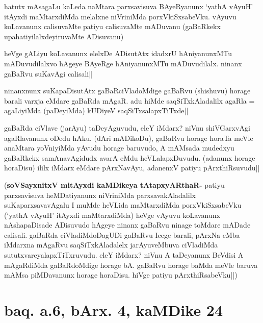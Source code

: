 \begin{artha}
hatutx mAsagaLu kaLeda naMtara parxsavisuva BAyeRyanunx `yathA vAyuH' 
itAyxdi maMtarxdiMda melalxne niVriniMda porxVkiSxsabeVku. vAyuvu 
koLavanunx calisuvaMte patiyu calisuvaMte mADuvanu (gaBaRkekx 
upahatiyilalxdeyiruvaMte ADisuvanu)
\end{artha}


\begin{artha}
heVge gALiyu koLavanunx elelxDe ADisutAtx idadxrU hAniyanunxMTu 
mADuvudilalxvo hAgeye BAyeRge hAniyanunxMTu mADuvudilalx. ninanx 
gaBaRvu suKavAgi calisali||
\end{artha}

\begin{artha}
ninanxnunx suKapaDisutAtx gaBaRciVladoMdige gaBaRvu (shishuvu) horage 
barali varxja eMdare gaBaRda mAgaR. adu hiMde saqSiTxkAladalilx agaRla 
= agaLiyiMda (paDeyiMda) kUDiyeV saqSiTxsalapxTiTxde||
\end{artha}


\begin{artha}
gaBaRda ciVlave (jarAyu) taDeyAguvudu, eleY iMdarx? niVnu shiVGarxvAgi 
agaRlavanunx oDedu hAku. (dAri mADikoDu), gaBaRvu horage horaTa meVle 
anaMtara yoVniyiMda yAvudu horage baruvudo, A mAMsada mudedxyu 
gaBaRkekx samAnavAgidudx avarA eMdu heVLalapxDuvudu. (adanunx horage 
horaDisu) ililx iMdarx eMdare pArxNavAyu, adanenxV patiyu 
pArxthiRsuvudu||
\end{artha}

(\textbf{soVSayxnitxV mitAyxdi kaMDikeya tAtapxyARthaR-} patiyu 
parxsavisuva heMDatiyanunx niVriniMda parxsavakAladalilx 
suKaparxsavavAgalu I muMde heVLida maMtarxdiMda porxVkiSxsabeVku 
(`yathA vAyuH' itAyxdi maMtarxdiMda) heVge vAyuvu koLavanunx 
nAshapaDisade ADisuvudo hAgeye ninanx gaBaRvu ninage toMdare mADade 
calisali. gaBaRda ciVladiMdoDagUDi gaBaRvu Icege barali, pArxNa eMba 
iMdarxna mAgaRvu saqSiTxkAladalelx jarAyuveMbuva ciVladiMda 
sututxvareyalapxTiTxruvudu. eleY iMdarx? niVnu A taDeyanunx BeVdisi A 
mAgaRdiMda gaBaRdoMdige horage bA. gaBaRvu horage baMda meVle baruva 
mAMsa piMDavanunx horage horaDisu. hiVge patiyu pArxthiRsabeVku||)

\section*{baq. a.6, bArx. 4, kaMDike 24}

